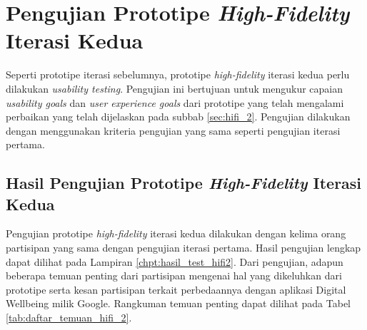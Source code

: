 \section{Pengujian Prototipe \textit{High-Fidelity} Iterasi Kedua}
\label{sec:test_2}

Seperti prototipe iterasi sebelumnya, prototipe \textit{high-fidelity} iterasi kedua perlu dilakukan \textit{usability testing}. Pengujian ini bertujuan untuk mengukur capaian \textit{usability goals} dan \textit{user experience goals} dari prototipe yang telah mengalami perbaikan yang telah dijelaskan pada subbab \ref{sec:hifi_2}. Pengujian dilakukan dengan menggunakan kriteria pengujian yang sama seperti pengujian iterasi pertama.

\subsection{Hasil Pengujian Prototipe \textit{High-Fidelity} Iterasi Kedua}

Pengujian prototipe \textit{high-fidelity} iterasi kedua dilakukan dengan kelima orang partisipan yang sama dengan pengujian iterasi pertama. Hasil pengujian lengkap dapat dilihat pada Lampiran \ref{chpt:hasil_test_hifi2}. Dari pengujian, adapun beberapa temuan penting dari partisipan mengenai hal yang dikeluhkan dari prototipe serta kesan partisipan terkait perbedaannya dengan aplikasi Digital Wellbeing milik Google. Rangkuman temuan penting dapat dilihat pada Tabel \ref{tab:daftar_temuan_hifi_2}.


